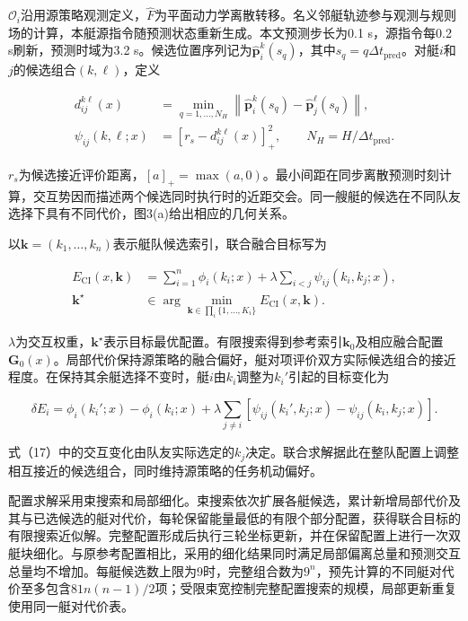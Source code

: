\documentclass[UTF8,a4paper,zihao=5,fontset=none]{ctexart}
\begin{document}
\(\mathcal O_i\)沿用源策略观测定义，\(\widehat F\)为平面动力学离散转移。名义邻艇轨迹参与观测与规则场的计算，本艇源指令随预测状态重新生成。本文预测步长为0.1
s，源指令每0.2 s刷新，预测时域为3.2
s。候选位置序列记为\(\widehat{\boldsymbol p}_i^k(s_q)\)，其中\(s_q=q\Delta t_{\mathrm{pred}}\)。对艇\(i\)和\(j\)的候选组合\((k,\ell)\)，定义

\[
\begin{aligned}
d_{ij}^{k\ell}(x)
&=\min_{q=1,\ldots,N_H}
\left\|\widehat{\boldsymbol p}_i^k(s_q)-\widehat{\boldsymbol p}_j^\ell(s_q)\right\|,\\
\psi_{ij}(k,\ell;x)&=\left[r_s-d_{ij}^{k\ell}(x)\right]_+^2,
\qquad N_H=H/\Delta t_{\mathrm{pred}}.
\end{aligned}
\tag{15}
\]

\(r_s\)为候选接近评价距离，\([a]_+=\max(a,0)\)。最小间距在同步离散预测时刻计算，交互势因而描述两个候选同时执行时的近距交会。同一艘艇的候选在不同队友选择下具有不同代价，图3(a)给出相应的几何关系。

以\(\boldsymbol k=(k_1,\ldots,k_n)\)表示艇队候选索引，联合融合目标写为

\[
\begin{aligned}
E_{\mathrm{CI}}(x,\boldsymbol k)
&=\sum_{i=1}^{n}\phi_i(k_i;x)
+\lambda\sum_{i<j}\psi_{ij}(k_i,k_j;x),\\
\boldsymbol k^\star&\in\arg\min_{\boldsymbol k\in\prod_i\{1,\ldots,K_i\}}
E_{\mathrm{CI}}(x,\boldsymbol k).
\end{aligned}
\tag{16}
\]

\(\lambda\)为交互权重，\(\boldsymbol k^\star\)表示目标最优配置。有限搜索得到参考索引\(\boldsymbol k_0\)及相应融合配置\(\boldsymbol G_0(x)\)。局部代价保持源策略的融合偏好，艇对项评价双方实际候选组合的接近程度。在保持其余艇选择不变时，艇\(i\)由\(k_i\)调整为\(k_i'\)引起的目标变化为

\[
\delta E_i=
\phi_i(k_i';x)-\phi_i(k_i;x)
+\lambda\sum_{j\ne i}
\left[\psi_{ij}(k_i',k_j;x)-\psi_{ij}(k_i,k_j;x)\right].
\tag{17}
\]

式（17）中的交互变化由队友实际选定的\(k_j\)决定。联合求解据此在整队配置上调整相互接近的候选组合，同时维持源策略的任务机动偏好。

配置求解采用束搜索和局部细化。束搜索依次扩展各艇候选，累计新增局部代价及其与已选候选的艇对代价，每轮保留能量最低的有限个部分配置，获得联合目标的有限搜索近似解。完整配置形成后执行三轮坐标更新，并在保留配置上进行一次双艇块细化。与原参考配置相比，采用的细化结果同时满足局部偏离总量和预测交互总量均不增加。每艇候选数上限为9时，完整组合数为\(9^n\)，预先计算的不同艇对代价至多包含\(81n(n-1)/2\)项；受限束宽控制完整配置搜索的规模，局部更新重复使用同一艇对代价表。
\end{document}
